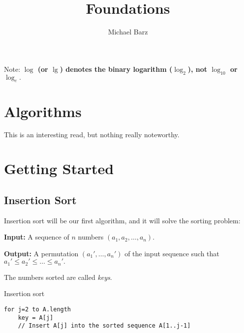 \documentclass{article}
\title{Foundations}
\author{Michael Barz}
\begin{document}
\maketitle

Note: \textbf{$\log$ (or $\lg$) denotes the binary logarithm ($\log_2$), not $\log_{10}$ or $\log_e.$}

\section{Algorithms}

This is an interesting read, but nothing really noteworthy.

\section{Getting Started}

\subsection{Insertion Sort}

	Insertion sort will be our first algorithm, and it will solve the sorting problem:
\begin{tcolorbox}[title=Sorting Problem]
	\textbf{Input:} A sequence of $n$ numbers $(a_1, a_2, \dots, a_n).$

	\textbf{Output:} A permutation $(a_1', \dots, a_n')$ of the input sequence such that $a_1' \leq a_2' \leq \dots \leq a_n'.$
\end{tcolorbox}

\vspace{2mm}

The numbers sorted are called \textit{keys}.

Insertion sort

\begin{lstlisting}[frame=single]
for j=2 to A.length
	key = A[j]
	// Insert A[j] into the sorted sequence A[1..j-1]

\end{lstlisting}
\end{document}
